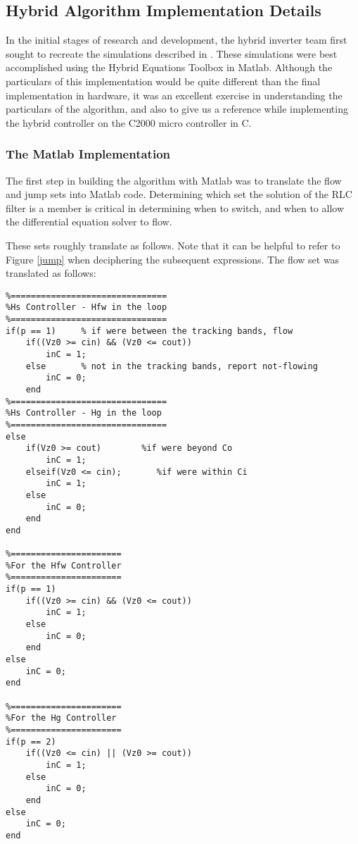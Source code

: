 \subsection{Hybrid Algorithm Implementation Details}
In the initial stages of research and development, the hybrid inverter team first sought to recreate the simulations described in \cite{ricardo}. These simulations were best accomplished using the Hybrid Equations Toolbox in Matlab. Although the particulars of this implementation would be quite different than the final implementation in hardware, it was an excellent exercise in understanding the particulars of the algorithm, and also to give us a reference while implementing the hybrid controller on the C2000 micro controller in C. 

\subsubsection{The Matlab Implementation}
The first step in building the algorithm with Matlab was to translate the flow and jump sets into Matlab code. Determining which set the solution of the RLC filter is a member is critical in determining when to switch, and when to allow the differential equation solver to flow. 

These sets roughly translate as follows. Note that it can be helpful to refer to Figure \ref{jump} when deciphering the subsequent expressions. The flow set was translated as follows:

\lstset{
  style              = Matlab-editor,
  basicstyle         = \mlttfamily,
  escapechar         = ",
  mlshowsectionrules = true,
}

\begin{lstlisting}
%===============================
%Hs Controller - Hfw in the loop
%===============================
if(p == 1)     % if were between the tracking bands, flow
    if((Vz0 >= cin) && (Vz0 <= cout))
        inC = 1;  
    else	   % not in the tracking bands, report not-flowing
        inC = 0;
    end
%===============================
%Hs Controller - Hg in the loop
%===============================
else 
    if(Vz0 >= cout)        %if were beyond Co
        inC = 1;
    elseif(Vz0 <= cin);       %if were within Ci
        inC = 1;
    else 
        inC = 0;
    end
end
    
%======================
%For the Hfw Controller
%======================
if(p == 1)    
    if((Vz0 >= cin) && (Vz0 <= cout))
        inC = 1;
    else
        inC = 0;
    end
else
    inC = 0;
end

%======================
%For the Hg Controller
%======================
if(p == 2)
    if((Vz0 <= cin) || (Vz0 >= cout))
        inC = 1;
    else
        inC = 0;
    end
else
    inC = 0;
end

\end{lstlisting}

